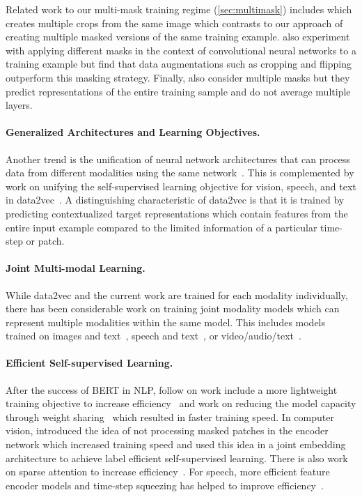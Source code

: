 \documentclass[nohyperref]{article}
\theoremstyle{plain}
\theoremstyle{definition}
\theoremstyle{remark}
\begin{document}
Related work to our multi-mask training regime (\textsection\ref{sec:multimask}) includes \citet{caron2020contrastive} which creates multiple crops from the same image which contrasts to our approach of creating multiple masked versions of the same training example.
\citet{jing2022maskedsiamese} also experiment with applying different masks in the context of convolutional neural networks to a training example but find that data augmentations such as cropping and flipping outperform this masking strategy.
Finally, \citet{wu2022extreme} also consider multiple masks but they predict representations of the entire training sample and do not average multiple layers.


\paragraph{Generalized Architectures and Learning Objectives.}
Another trend is the unification of neural network architectures that can process data from different modalities using the same network~\citep{jaegle2021perceiver,jaegle2022perceiverio}. 
This is complemented by work on unifying the self-supervised learning objective for vision, speech, and text in data2vec~\citep{baevski2022d2v}. 
A distinguishing characteristic of data2vec is that it is trained by predicting contextualized target representations which contain features from the entire input example compared to the limited information of a particular time-step or patch.

\paragraph{Joint Multi-modal Learning.}
While data2vec and the current work are trained for each modality individually, there has been considerable work on training joint modality models which can represent multiple modalities within the same model. 
This includes models trained on images and text~\citep{radford2021clip,singh2021flava,wang2021vlmo,alayrac2022flamingo}, speech and text~\citep{shi2022avhubert}, or video/audio/text~\citep{akbari2021vatt}.


\paragraph{Efficient Self-supervised Learning.}
After the success of BERT in NLP, follow on work include a more lightweight training objective to increase efficiency~\citep{clark2020electra} and work on reducing the model capacity through weight sharing~\citep{lan2019albert} which resulted in faster training speed.
In computer vision, \citet{he2021mae} introduced the idea of not processing masked patches in the encoder network which increased training speed and \citet{assran2022masked} used this idea in a joint embedding architecture to achieve label efficient self-supervised learning. 
There is also work on sparse attention to increase efficiency~\citep{li2021esvit}.
For speech, more efficient feature encoder models and time-step squeezing has helped to improve efficiency~\citep{wu2022interspeech,vyas2022interspeech}.
\end{document}
